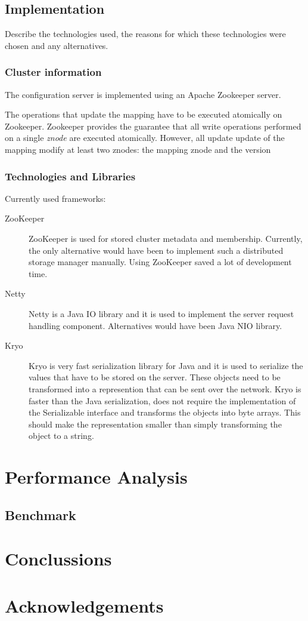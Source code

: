 \documentclass[11pt,a4paper]{globis-book}
\begin{document}
\section{Implementation}
Describe the technologies used, the reasons for which these technologies were chosen and any alternatives.

\subsection{Cluster information}
The configuration server is implemented using an Apache Zookeeper server. 

The operations that update the mapping have to be executed atomically on Zookeeper. Zookeeper provides the guarantee that all write operations performed on a single \textit{znode} are executed atomically. However, all update update of the mapping modify at least two znodes: the mapping znode and the version  

\subsection{Technologies and Libraries}
Currently used frameworks:
\begin{description}
    \item[ZooKeeper] ZooKeeper is used for stored cluster metadata and membership. Currently, the only alternative would have been to implement such a distributed storage manager manually. Using ZooKeeper saved a lot of development time. 
    \item[Netty] Netty is a Java IO library and it is used to implement the server request handling component. Alternatives would have been Java NIO library.
    \item[Kryo] Kryo is very fast serialization library for Java and it is used to serialize the values that have to be stored on the server. These objects need to be transformed into a represention that can be sent over the network. Kryo is faster than the Java serialization, does not require the implementation of the Serializable interface and transforms the objects into byte arrays. This should make the representation smaller than simply transforming the object to a string.
\end{description}

\chapter{Performance Analysis}
\section{Benchmark}

\chapter{Conclussions}

\appendix

\listoffigures
\listoftables

\chapter*{Acknowledgements}

\newpage
\thispagestyle{empty}



\end{document}
